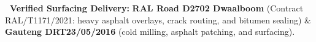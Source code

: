 \vfill

\noindent
\begin{tcolorbox}[enhanced, colback=white, colframe=mhnavy, boxrule=0.8pt, arc=3pt, left=8pt, right=8pt, top=6pt, bottom=6pt, drop shadow=black!3]
    {\fontsize{8pt}{10.6pt}\selectfont\color{mhnavy}\bfseries\faCheckCircle\ Verified Surfacing Delivery:}\quad
    {\fontsize{8pt}{10.6pt}\selectfont\color{mhtext}
    \textbf{RAL Road D2702 Dwaalboom} (Contract RAL/T1171/2021: heavy asphalt overlays, crack routing, and bitumen sealing) \& \textbf{Gauteng DRT23/05/2016} (cold milling, asphalt patching, and surfacing).
    }
\end{tcolorbox}

\clearpage
